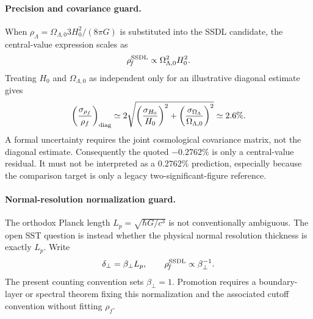\paragraph{Precision and covariance guard.}
When \(\rho_\Lambda=\Omega_{\Lambda,0}3H_0^2/(8\pi G)\) is substituted into
the SSDL candidate, the central-value expression scales as
\begin{align}
    \rho_{\!f}^{\rm SSDL}
    \propto
    \Omega_{\Lambda,0}^{2}H_0^2 .
\end{align}
Treating \(H_0\) and \(\Omega_{\Lambda,0}\) as independent only for an
illustrative diagonal estimate gives
\begin{align}
    \left(\frac{\sigma_{\rho_f}}{\rho_f}\right)_{\rm diag}
    \simeq
    2\sqrt{
        \left(\frac{\sigma_{H_0}}{H_0}\right)^2
        +
        \left(\frac{\sigma_{\Omega_\Lambda}}{\Omega_{\Lambda,0}}\right)^2
    }
    \simeq
    2.6\% .
    \label{eq:rt_ssdl_diagonal_uncertainty}
\end{align}
A formal uncertainty requires the joint cosmological covariance matrix, not
the diagonal estimate.  Consequently the quoted \(-0.2762\%\) is only a
central-value residual.  It must not be interpreted as a \(0.2762\%\)
prediction, especially because the comparison target is only a legacy
two-significant-figure reference.

\paragraph{Normal-resolution normalization guard.}
The orthodox Planck length \(L_p=\sqrt{\hbar G/c^3}\) is not conventionally
ambiguous.  The open SST question is instead whether the physical normal
resolution thickness is exactly \(L_p\).  Write
\begin{align}
    \delta_\perp
    =
    \beta_\perp L_p,
    \qquad
    \rho_{\!f}^{\rm SSDL}
    \propto
    \beta_\perp^{-1} .
    \label{eq:rt_ssdl_normalization_beta}
\end{align}
The present counting convention sets \(\beta_\perp=1\).  Promotion requires
a boundary-layer or spectral theorem fixing this normalization and the
associated cutoff convention without fitting \(\rho_{\!f}\).

